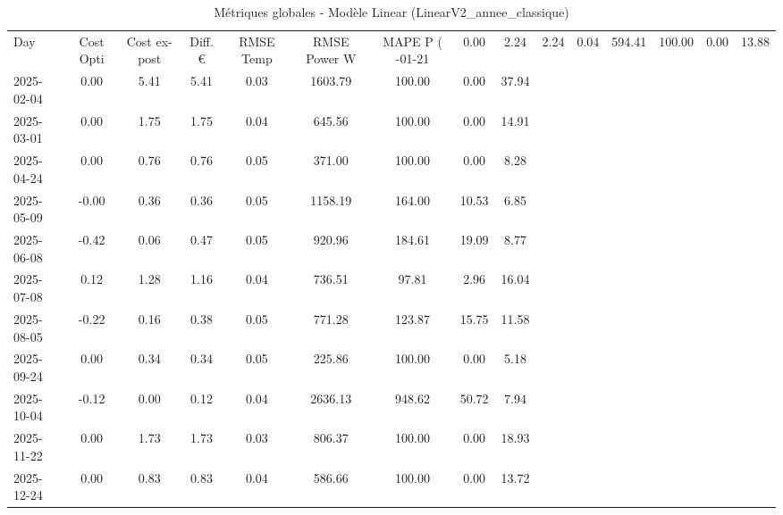 \begin{table}
\caption{Métriques globales - Modèle Linear (LinearV2_annee_classique)}
\label{tab:Linear_LinearV2_annee_classique_Validation_EPlus_VS_Opti}
\begin{small}
\begin{tabular}{lcccccccc}
\toprule
Day & Cost Opti & Cost ex-post & Diff. € & RMSE Temp & RMSE Power W & MAPE P (%
-01-21 & 0.00 & 2.24 & 2.24 & 0.04 & 594.41 & 100.00 & 0.00 & 13.88 \\
2025-02-04 & 0.00 & 5.41 & 5.41 & 0.03 & 1603.79 & 100.00 & 0.00 & 37.94 \\
2025-03-01 & 0.00 & 1.75 & 1.75 & 0.04 & 645.56 & 100.00 & 0.00 & 14.91 \\
2025-04-24 & 0.00 & 0.76 & 0.76 & 0.05 & 371.00 & 100.00 & 0.00 & 8.28 \\
2025-05-09 & -0.00 & 0.36 & 0.36 & 0.05 & 1158.19 & 164.00 & 10.53 & 6.85 \\
2025-06-08 & -0.42 & 0.06 & 0.47 & 0.05 & 920.96 & 184.61 & 19.09 & 8.77 \\
2025-07-08 & 0.12 & 1.28 & 1.16 & 0.04 & 736.51 & 97.81 & 2.96 & 16.04 \\
2025-08-05 & -0.22 & 0.16 & 0.38 & 0.05 & 771.28 & 123.87 & 15.75 & 11.58 \\
2025-09-24 & 0.00 & 0.34 & 0.34 & 0.05 & 225.86 & 100.00 & 0.00 & 5.18 \\
2025-10-04 & -0.12 & 0.00 & 0.12 & 0.04 & 2636.13 & 948.62 & 50.72 & 7.94 \\
2025-11-22 & 0.00 & 1.73 & 1.73 & 0.03 & 806.37 & 100.00 & 0.00 & 18.93 \\
2025-12-24 & 0.00 & 0.83 & 0.83 & 0.04 & 586.66 & 100.00 & 0.00 & 13.72 \\
\bottomrule
\end{tabular}
\end{small}
\end{table}
